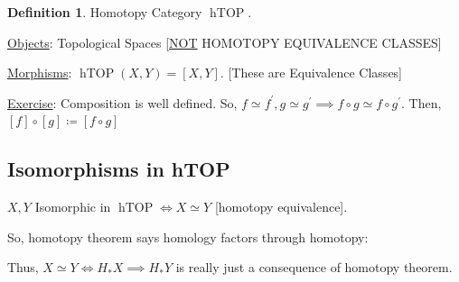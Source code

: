 \documentclass{article}
\theoremstyle{definition}
\newtheorem*{definition}{Definition}
\begin{document}

    \begin{definition}
        Homotopy Category \(\operatorname{hTOP}\).

        \underline{Objects}: Topological Spaces [\underline{NOT} HOMOTOPY EQUIVALENCE CLASSES]

        \underline{Morphisms}: \(\operatorname{hTOP}(X,Y) = [X,Y]\). [These are Equivalence Classes]
        
        \underline{Exercise}: Composition is well defined. So, \(f \simeq f^{\prime} , g \simeq g^{\prime} \implies f \circ g \simeq f
        \circ g^{\prime}\). Then, \([f] \circ [g] \coloneqq [f \circ g]\) 
    \end{definition}

    \subsection*{Isomorphisms in hTOP}

    \(X,Y\) Isomorphic in \(\operatorname{hTOP} \iff X \simeq Y\) [homotopy equivalence].

    So, homotopy theorem says homology factors through homotopy:

    \begin{center}
    \end{center}

    Thus, \(X \simeq Y \iff H_{\ast} X \implies H_{\ast} Y\) is really just a consequence of homotopy theorem.
\end{document}
